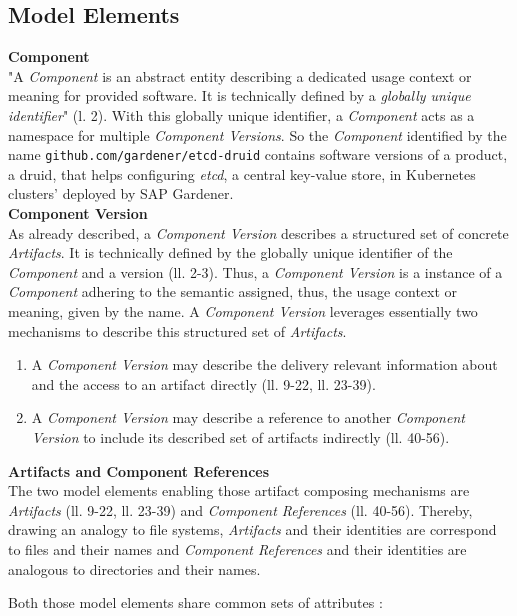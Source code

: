 \subsection{Model Elements}

\noindent\textbf{Component}\\
"A \emph{Component} is an abstract entity describing a dedicated usage context or meaning for provided software. It is technically defined by a \emph{globally unique identifier}"\cite{OCMSpec} (l. 2). With this globally unique identifier, a \emph{Component} acts as a namespace for multiple \emph{Component Versions}. So the \emph{Component} identified by the name \lstinline|github.com/gardener/etcd-druid| contains software versions of a product, a druid, that helps configuring \emph{etcd}, a central key-value store, in Kubernetes clusters' deployed by SAP Gardener.\\

\noindent\textbf{Component Version}\\
As already described, a \emph{Component Version} describes a structured set of concrete \emph{Artifacts}. It is technically defined by the globally unique identifier of the \emph{Component} and a version (ll. 2-3). Thus, a \emph{Component Version} is a instance of a \emph{Component} adhering to the semantic assigned, thus, the usage context or meaning, given by the name. A \emph{Component Version} leverages essentially two mechanisms to describe this structured set of \emph{Artifacts}. 
\begin{enumerate}
\item A \emph{Component Version} may describe the delivery relevant information about and the access to an artifact directly (ll. 9-22, ll. 23-39).
\item A \emph{Component Version} may describe a reference to another \emph{Component Version} to include its described set of artifacts indirectly (ll. 40-56).
\end{enumerate}

\noindent\textbf{Artifacts and Component References}\\
The two model elements enabling those artifact composing mechanisms are \emph{Artifacts} (ll. 9-22, ll. 23-39) and \emph{Component References} (ll. 40-56). Thereby, drawing an analogy to file systems, \emph{Artifacts} and their identities are correspond to files and their names and \emph{Component References} and their identities are analogous to directories and their names.\par
Both those model elements share common sets of attributes \cite{OCMSpec}:\\


